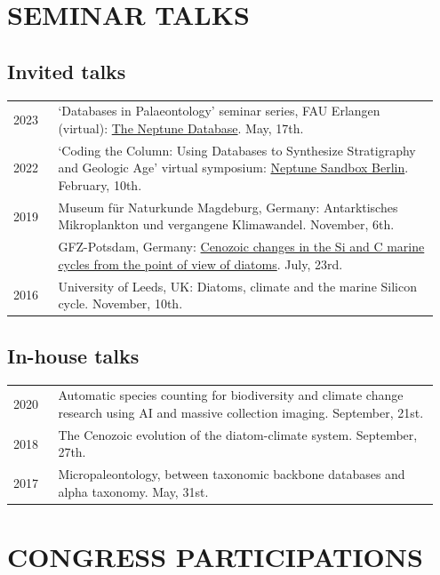\documentclass[11pt, a4paper]{article}
\begin{document}
\section{SEMINAR TALKS}
\subsection{Invited talks}
\begin{longtable}{@{}p{0.1\linewidth} >{\small}P{0.85\linewidth}@{}}
2023 & `Databases in Palaeontology' seminar series, FAU Erlangen (virtual): \href{https://www.youtube.com/watch?v=g8-W1U6LhVw}{The Neptune Database}. May, 17th.\\
2022 & `Coding the Column: Using Databases to Synthesize Stratigraphy and Geologic Age' virtual symposium: \href{https://plannapus.github.io/data/20220210CodingTheColumn.pdf}{Neptune Sandbox Berlin}. February, 10th.\\
2019 & Museum f\"{u}r Naturkunde Magdeburg, Germany: Antarktisches Mikroplankton und vergangene Klimawandel. November, 6th.\\
    & GFZ-Potsdam, Germany: \href{http://plannapus.github.io/data/20190723Potsdam.pdf}{Cenozoic changes in the Si and C marine cycles from the point of view of diatoms}. July, 23rd.\\
2016 & University of Leeds, UK: Diatoms, climate and the marine Silicon cycle. November, 10th.\\
\end{longtable}
\subsection{In-house talks}
\begin{longtable}{@{}p{0.1\linewidth} >{\small}P{0.85\linewidth}@{}}
2020 & Automatic species counting for biodiversity and climate change research using AI and massive collection imaging. September, 21st.\\
2018 & The Cenozoic evolution of the diatom-climate system. September, 27th.\\
2017 & Micropaleontology, between taxonomic backbone databases and alpha taxonomy. May, 31st.\\
\end{longtable}

\section{CONGRESS PARTICIPATIONS}
\end{document}
